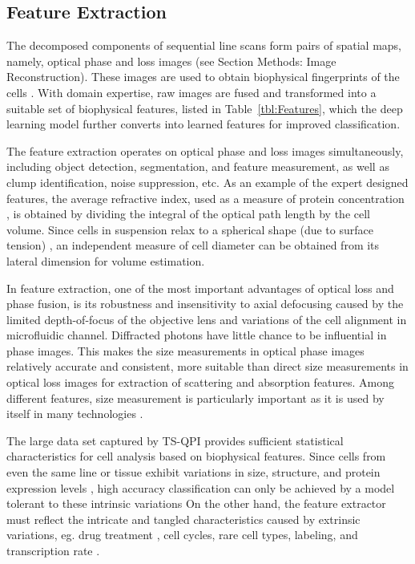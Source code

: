 \documentclass[aps,pra,reprint,superscriptaddress]{revtex4-1}
\begin{document}
\subsection*{Feature Extraction}

The decomposed components of sequential line scans form pairs of spatial maps, namely, optical phase and loss images (see Section Methods: Image Reconstruction). These images are used to obtain biophysical fingerprints of the cells \cite{mahjoubfar2013optically, driscoll2012automated}. With domain expertise, raw images are fused and transformed into a suitable set of biophysical features, listed in Table~\ref{tbl:Features}, which the deep learning model further converts into learned features for improved classification. 

The feature extraction operates on optical phase and loss images simultaneously, including object detection, segmentation, and feature measurement, as well as clump identification, noise suppression, etc. As an example of the expert designed features, the average refractive index, used as a measure of protein concentration \cite{barer1953refractometry}, is obtained by dividing the integral of the optical path length by the cell volume. Since cells in suspension relax to a spherical shape (due to surface tension) \cite{revel1974adhesion,whur1977substrate}, an independent measure of cell diameter can be obtained from its lateral dimension for volume estimation. 

In feature extraction, one of the most important advantages of optical loss and phase fusion, is its robustness and insensitivity to axial defocusing \cite{spadinger1990effect} caused by the limited depth-of-focus of the objective lens and variations of the cell alignment in microfluidic channel. Diffracted photons have little chance to be influential in phase images. This makes the size measurements in optical phase images relatively accurate and consistent, more suitable than direct size measurements in optical loss images for extraction of scattering and absorption features. Among different features, size measurement is particularly important as it is used by itself in many technologies \cite{adams2008highly, nagrath2007isolation, vona2000isolation, gossett2010label}.  

The large data set captured by TS-QPI provides sufficient statistical characteristics for cell analysis based on biophysical features. Since cells from even the same line or tissue exhibit variations in size, structure, and protein expression levels \cite{kaern2005stochasticity, maheshri2007living, zangle2014live}, high accuracy classification can only be achieved by a model tolerant to these intrinsic variations 
On the other hand, the feature extractor must reflect the intricate and tangled characteristics caused by extrinsic variations, eg. drug treatment \cite{spencer2009non}, cell cycles, rare cell types, labeling, and transcription rate \cite{johnston2012mitochondrial}. 
\end{document}
